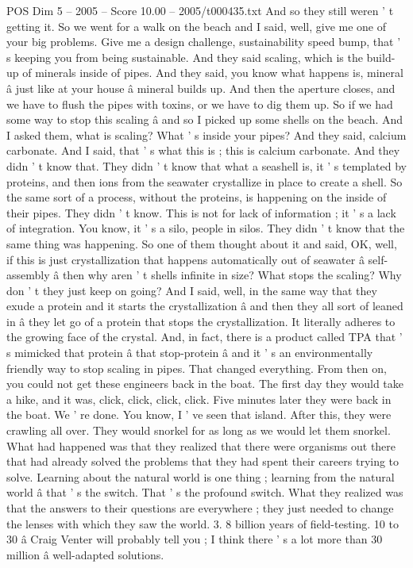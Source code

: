 \begin{textsample}{POS Dim 5 – 2005 – Score 10.00 – 2005/t000435.txt}
And so they still weren ' t getting it.
So we went for a walk on the beach and I said, well, give me one of your big problems.
Give me a design challenge, sustainability speed bump, that ' s keeping you from being sustainable.
And they said scaling, which is the build-up of minerals inside of pipes.
And they said, you know what happens is, mineral â just like at your house â mineral builds up.
And then the aperture closes, and we have to flush the pipes with toxins, or we have to dig them up.
So if we had some way to stop this scaling â and so I picked up some shells on the beach.
And I asked them, what is scaling?
What ' s inside your pipes?
And they said, calcium carbonate.
And I said, that ' s what this is ; this is calcium carbonate.
And they didn ' t know that.
They didn ' t know that what a seashell is, it ' s templated by proteins, and then ions from the seawater crystallize in place to create a shell.
So the same sort of a process, without the proteins, is happening on the inside of their pipes.
They didn ' t know.
This is not for lack of information ; it ' s a lack of integration.
You know, it ' s a silo, people in silos.
They didn ' t know that the same thing was happening.
So one of them thought about it and said, OK, well, if this is just crystallization that happens automatically out of seawater â self-assembly â then why aren ' t shells infinite in size?
What stops the scaling?
Why don ' t they just keep on going?
And I said, well, in the same way that they exude a protein and it starts the crystallization â and then they all sort of leaned in â they let go of a protein that stops the crystallization.
It literally adheres to the growing face of the crystal.
And, in fact, there is a product called TPA that ' s mimicked that protein â that stop-protein â and it ' s an environmentally friendly way to stop scaling in pipes.
That changed everything.
From then on, you could not get these engineers back in the boat.
The first day they would take a hike, and it was, click, click, click, click.
Five minutes later they were back in the boat.
We ' re done.
You know, I ' ve seen that island.
After this, they were crawling all over.
They would snorkel for as long as we would let them snorkel.
What had happened was that they realized that there were organisms out there that had already solved the problems that they had spent their careers trying to solve.
Learning about the natural world is one thing ; learning from the natural world â that ' s the switch.
That ' s the profound switch.
What they realized was that the answers to their questions are everywhere ; they just needed to change the lenses with which they saw the world. 3. 8 billion years of field-testing. 10 to 30 â Craig Venter will probably tell you ; I think there ' s a lot more than 30 million â well-adapted solutions.

\end{textsample}
